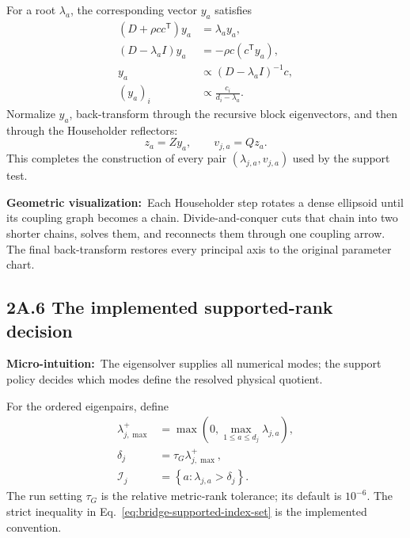 \documentclass[10pt,twocolumn]{article}
\newcommand{\micro}[1]{\par\noindent\textbf{Micro-intuition:}\ #1\par}
\newcommand{\geom}[1]{\par\noindent\textbf{Geometric visualization:}\ \textcolor{teal!70!black}{#1}\par}
\newcommand{\conceptbreak}{\par\medskip\noindent{\color{black!30}\rule{\columnwidth}{0.35pt}}\par\medskip}
\begin{document}
For a root \(\lambda_a\), the corresponding vector \(y_a\) satisfies
\begin{align}
(D+\rho cc^{\mathsf T})y_a&=\lambda_a y_a,
\label{eq:bridge-rank-one-eigenvector-1}\\
(D-\lambda_aI)y_a&=-\rho c(c^{\mathsf T}y_a),
\label{eq:bridge-rank-one-eigenvector-2}\\
y_a&\propto(D-\lambda_aI)^{-1}c,
\label{eq:bridge-rank-one-eigenvector-3}\\
(y_a)_i&\propto\frac{c_i}{d_i-\lambda_a}.
\label{eq:bridge-rank-one-eigenvector-4}
\end{align}
Normalize \(y_a\), back-transform through the recursive block eigenvectors,
and then through the Householder reflectors:
\begin{equation}
z_a=Zy_a,
\qquad
v_{j,a}=Qz_a.
\label{eq:bridge-eigenvector-backtransform}
\end{equation}
This completes the construction of every pair
\((\lambda_{j,a},v_{j,a})\) used by the support test.

\geom{Each Householder step rotates a dense ellipsoid until its coupling graph
becomes a chain. Divide-and-conquer cuts that chain into two shorter chains,
solves them, and reconnects them through one coupling arrow. The final
back-transform restores every principal axis to the original parameter chart.}

\conceptbreak

\subsection*{2A.6 The implemented supported-rank decision}

\micro{The eigensolver supplies all numerical modes; the support policy decides
which modes define the resolved physical quotient.}

For the ordered eigenpairs, define
\begin{align}
\lambda_{j,\max}^{+}
&=\max\left(0,\max_{1\leq a\leq d_j}\lambda_{j,a}\right),
\label{eq:bridge-positive-spectral-scale}\\
\delta_j&=\tau_G\lambda_{j,\max}^{+},
\label{eq:bridge-support-threshold}\\
\mathcal I_j
&=\left\{a:\lambda_{j,a}>\delta_j\right\}.
\label{eq:bridge-supported-index-set}
\end{align}
The run setting \(\tau_G\) is the relative metric-rank tolerance; its default
is \(10^{-6}\). The strict inequality in
Eq.~\eqref{eq:bridge-supported-index-set} is the implemented convention.
\end{document}
